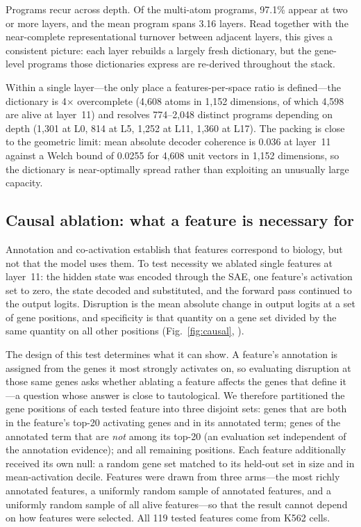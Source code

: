 \documentclass[onecolumn,11pt]{article}
\begin{document}
Programs recur across depth. Of the multi-atom programs, 97.1\% appear at two or more layers, and
the mean program spans 3.16 layers. Read together with the near-complete representational turnover
between adjacent layers, this gives a consistent picture: each layer rebuilds a largely fresh
dictionary, but the gene-level programs those dictionaries express are re-derived throughout the
stack.

Within a single layer---the only place a features-per-space ratio is defined---the dictionary is
4$\times$ overcomplete (4,608 atoms in 1,152 dimensions, of which 4,598 are alive at layer~11) and
resolves 774--2,048 distinct programs depending on depth (1,301 at L0, 814 at L5, 1,252 at L11,
1,360 at L17). The packing is close to the geometric limit: mean absolute decoder coherence is
0.036 at layer~11 against a Welch bound of 0.0255 for 4,608 unit vectors in 1,152 dimensions, so
the dictionary is near-optimally spread rather than exploiting an unusually large capacity.


\subsection*{Causal ablation: what a feature is necessary for}
\label{sec:causal}

Annotation and co-activation establish that features correspond to biology, but not that the model
uses them. To test necessity we ablated single features at layer~11: the hidden state was encoded
through the SAE, one feature's activation set to zero, the state decoded and substituted, and the
forward pass continued to the output logits. Disruption is the mean absolute change in output
logits at a set of gene positions, and specificity is that quantity on a gene set divided by the
same quantity on all other positions (Fig.~\ref{fig:causal}, ).

The design of this test determines what it can show. A feature's annotation is assigned from the
genes it most strongly activates on, so evaluating disruption at those same genes asks whether
ablating a feature affects the genes that define it---a question whose answer is close to
tautological. We therefore partitioned the gene positions of each tested feature into three disjoint
sets: genes that are both in the feature's top-20 activating genes and in its annotated term; genes
of the annotated term that are \emph{not} among its top-20 (an evaluation set independent of the
annotation evidence); and all remaining positions. Each feature additionally received its own null:
a random gene set matched to its held-out set in size and in mean-activation decile. Features were
drawn from three arms---the most richly annotated features, a uniformly random sample of annotated
features, and a uniformly random sample of all alive features---so that the result cannot depend on
how features were selected. All 119 tested features come from K562 cells.
\end{document}
